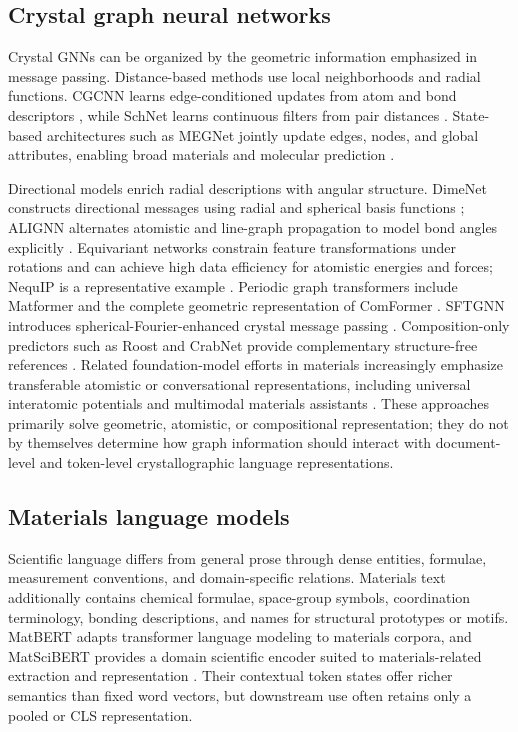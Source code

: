\documentclass[a4paper,fleqn]{cas-sc}
\begin{document}
\subsection{Crystal graph neural networks}
Crystal GNNs can be organized by the geometric information emphasized in message passing. Distance-based methods use local neighborhoods and radial functions. CGCNN learns edge-conditioned updates from atom and bond descriptors \citep{xie2018cgcnn}, while SchNet learns continuous filters from pair distances \citep{schutt2018schnet}. State-based architectures such as MEGNet jointly update edges, nodes, and global attributes, enabling broad materials and molecular prediction \citep{chen2019megnet}.

Directional models enrich radial descriptions with angular structure. DimeNet constructs directional messages using radial and spherical basis functions \citep{gasteiger2020dimenet}; ALIGNN alternates atomistic and line-graph propagation to model bond angles explicitly \citep{choudhary2021alignn}. Equivariant networks constrain feature transformations under rotations and can achieve high data efficiency for atomistic energies and forces; NequIP is a representative example \citep{batzner2022nequip}. Periodic graph transformers include Matformer and the complete geometric representation of ComFormer \citep{yan2022matformer,yan2024comformer}. SFTGNN introduces spherical-Fourier-enhanced crystal message passing \citep{jiang2025sftgnn}. Composition-only predictors such as Roost and CrabNet provide complementary structure-free references \citep{goodall2020roost,wang2021crabnet}. Related foundation-model efforts in materials increasingly emphasize transferable atomistic or conversational representations, including universal interatomic potentials and multimodal materials assistants \citep{chen2022m3gnet,deng2023chgnet,batatia2023mace,tang2025matterchat}. These approaches primarily solve geometric, atomistic, or compositional representation; they do not by themselves determine how graph information should interact with document-level and token-level crystallographic language representations.

\subsection{Materials language models}
Scientific language differs from general prose through dense entities, formulae, measurement conventions, and domain-specific relations. Materials text additionally contains chemical formulae, space-group symbols, coordination terminology, bonding descriptions, and names for structural prototypes or motifs. MatBERT adapts transformer language modeling to materials corpora, and MatSciBERT provides a domain scientific encoder suited to materials-related extraction and representation \citep{walker2021matbert,gupta2022matscibert}. Their contextual token states offer richer semantics than fixed word vectors, but downstream use often retains only a pooled or CLS representation.
\end{document}
